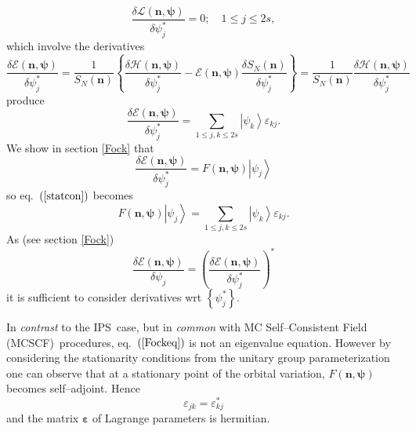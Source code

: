 \documentclass[aps,preprint]{revtex4}%
\begin{document}
\begin{equation}
\frac{\delta\mathcal{L}\left(  \boldsymbol{n,\psi}\right)  }{\delta\psi
_{j}^{\ast}}=0;\quad1\leq j\leq2s,
\end{equation}
which involve the derivatives
\begin{equation}
\frac{\delta\mathcal{E}\left(  \boldsymbol{n,\psi}\right)  }{\delta\psi
_{j}^{\ast}}=\frac{1}{S_{N}\left(  \boldsymbol{n}\right)  }\left\{
\frac{\delta\mathcal{H}\left(  \boldsymbol{n,\psi}\right)  }{\delta\psi
_{j}^{\ast}}-\mathcal{E}\left(  \boldsymbol{n,\psi}\right)  \frac{\delta
S_{N}\left(  \boldsymbol{n}\right)  }{\delta\psi_{j}^{\ast}}\right\}
=\frac{1}{S_{N}\left(  \boldsymbol{n}\right)  }\frac{\delta\mathcal{H}\left(
\boldsymbol{n,\psi}\right)  }{\delta\psi_{j}^{\ast}}%
\end{equation}
produce
\begin{equation}
\frac{\delta\mathcal{E}\left(  \boldsymbol{n,\psi}\right)  }{\delta\psi
_{j}^{\ast}}=\sum_{1\leq j,k\leq2s}\left\vert \psi_{k}\right\rangle
\varepsilon_{kj}. \label{statcon}%
\end{equation}
We show in section \ref{Fock} that
\begin{equation}
\frac{\delta\mathcal{E}\left(  \boldsymbol{n,\psi}\right)  }{\delta\psi
_{j}^{\ast}}=F\left(  \boldsymbol{n,\psi}\right)  \left\vert \psi
_{j}\right\rangle
\end{equation}
so eq.\ $\left(  \ref{statcon}\right)  $ becomes
\begin{equation}
F\left(  \boldsymbol{n,\psi}\right)  \left\vert \psi_{j}\right\rangle
=\sum_{1\leq j,k\leq2s}\left\vert \psi_{k}\right\rangle \varepsilon_{kj}.
\label{Fockeq}%
\end{equation}
As (see section \ref{Fock})%
\begin{equation}
\frac{\delta\mathcal{E}\left(  \boldsymbol{n,\psi}\right)  }{\delta\psi_{j}%
}=\left(  \frac{\delta\mathcal{E}\left(  \boldsymbol{n,\psi}\right)  }%
{\delta\psi_{j}^{\ast}}\right)  ^{\ast}%
\end{equation}
it is sufficient to consider derivatives wrt $\left\{  \psi_{j}^{\ast
}\right\}  $.

In \emph{contrast} to the IPS\ case, but in \emph{common} with MC
Self--Consistent Field (MCSCF)\ procedures, eq.\ $\left(  \ref{Fockeq}\right)
$ is not an eigenvalue equation. However by considering the stationarity
conditions from the unitary group parameterization one can observe that at a
stationary point of the orbital variation, $F\left(  \boldsymbol{n,\psi
}\right)  $ becomes self--adjoint. Hence
\begin{equation}
\varepsilon_{jk}=\varepsilon_{kj}^{\ast}%
\end{equation}
and the matrix $\boldsymbol{\varepsilon}$ of Lagrange parameters is hermitian.
\end{document}

